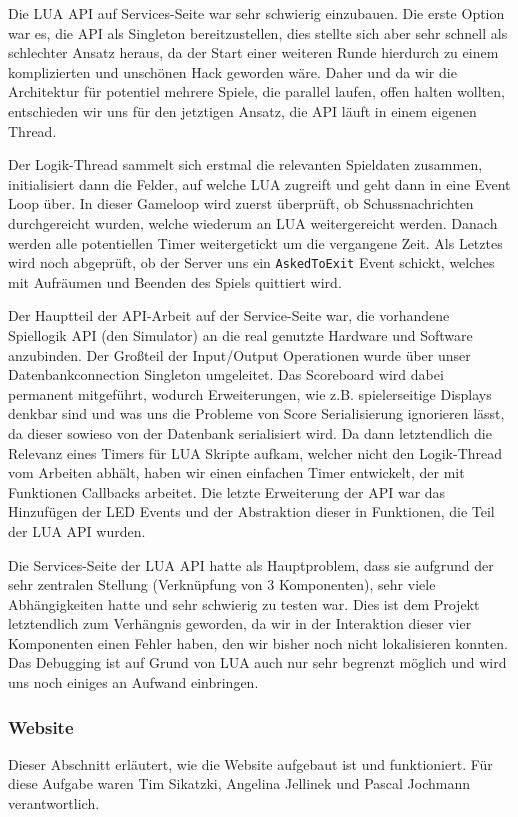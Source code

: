 Die LUA API auf Services-Seite war sehr schwierig einzubauen. Die erste Option war es, die API als Singleton bereitzustellen, dies stellte sich aber sehr schnell als schlechter Ansatz heraus, da der Start einer weiteren Runde hierdurch zu einem komplizierten und unschönen Hack geworden wäre. Daher und da wir die Architektur für potentiel mehrere Spiele, die parallel laufen, offen halten wollten, entschieden wir uns für den jetztigen Ansatz, die API läuft in einem eigenen Thread. 

Der Logik-Thread sammelt sich erstmal die relevanten Spieldaten zusammen, initialisiert dann die Felder, auf welche LUA zugreift und geht dann in eine Event Loop über. In dieser Gameloop wird zuerst überprüft, ob Schussnachrichten durchgereicht wurden, welche wiederum an LUA weitergereicht werden. Danach werden alle potentiellen Timer weitergetickt um die vergangene Zeit. Als Letztes wird noch abgeprüft, ob der Server uns ein \texttt{AskedToExit} Event schickt, welches mit Aufräumen und Beenden des Spiels quittiert wird.

Der Hauptteil der API-Arbeit auf der Service-Seite war, die vorhandene Spiellogik API (den Simulator) an die real genutzte Hardware und Software anzubinden. Der Großteil der Input/Output Operationen wurde über unser Datenbankconnection Singleton umgeleitet. Das Scoreboard wird dabei permanent mitgeführt, wodurch Erweiterungen, wie z.B. spielerseitige Displays denkbar sind und was uns die Probleme von Score Serialisierung ignorieren lässt, da dieser sowieso von der Datenbank serialisiert wird. Da dann letztendlich die Relevanz eines Timers für LUA Skripte aufkam, welcher nicht den Logik-Thread vom Arbeiten abhält, haben wir einen einfachen Timer entwickelt, der mit Funktionen Callbacks arbeitet. Die letzte Erweiterung der API war das Hinzufügen der LED Events und der Abstraktion dieser in Funktionen, die Teil der LUA API wurden.

Die Services-Seite der LUA API hatte als Hauptproblem, dass sie aufgrund der sehr zentralen Stellung (Verknüpfung von 3 Komponenten), sehr viele Abhängigkeiten hatte und sehr schwierig zu testen war. Dies ist dem Projekt letztendlich zum Verhängnis geworden, da wir in der Interaktion dieser vier Komponenten einen Fehler haben, den wir bisher noch nicht lokalisieren konnten. Das Debugging ist auf Grund von LUA auch nur sehr begrenzt möglich und wird uns noch einiges an Aufwand einbringen.

\subsubsection{Website}
\label{sec:services-website}
Dieser Abschnitt erläutert, wie die Website aufgebaut ist und funktioniert. Für diese Aufgabe waren Tim Sikatzki, Angelina Jellinek und Pascal Jochmann verantwortlich.

